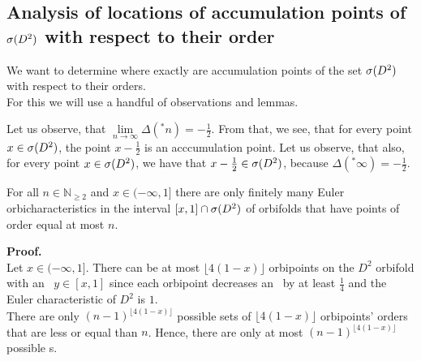 \subsection{Analysis of locations of accumulation points of ${{\sigma}(D^2)}$ with respect to their order}
We want to determine where exactly are accumulation points of the set ${{\sigma}(D^2)}$ with 
respect to their orders. \\
For this we will use  
a handful of observations and lemmas. 
\begin{observation}\label{accumulation_points_are_in_the_spectrum}
Let us observe, that $\lim\limits_{n \to \infty} \Delta(^\ast n) = -\frac{1}{2}$. From that, 
we see, 
that for every point $x \in {{\sigma}(D^2)}$, the point $x - \frac{1}{2}$ is an acccumulation point. 
Let us observe, that also, for every point $x \in {{\sigma}(D^2)}$, we have that $x - \frac{1}{2} 
\in {{\sigma}(D^2)}$, 
because $\Delta(^\ast \infty) = -\frac{1}{2}$. 
\end{observation}

\begin{lemma}\label{finiteness_lemma}
For all $n \in \mathbb{N}_{\geq 2}$ and $x \in (-\infty, 1]$ there are only finitely 
many Euler orbicharacteristics
in the interval $[x,1] \cap {{\sigma}(D^2)}$ of orbifolds that have points of order equal 
at most $n$. 
\end{lemma}
\textbf{Proof.} \\
Let $x \in (-\infty, 1]$. There can be at most $\lfloor 4(1-x) \rfloor$ orbipoints on the 
$D^2$ orbifold 
with an \Eoc\ $y \in [x,1]$ since each orbipoint decreases an \Eoc\ by at least $\frac{1}{4}$ 
and the Euler characteristic of $D^2$ is $1$. \\
There are only $(n-1)^{\lfloor 4(1-x) \rfloor}$ possible sets of $\lfloor 4(1-x) \rfloor$ 
orbipoints' orders that are less or equal than $n$. Hence, there are only at most 
$(n-1)^{\lfloor 4(1-x) \rfloor}$ possible \Eoc s.


